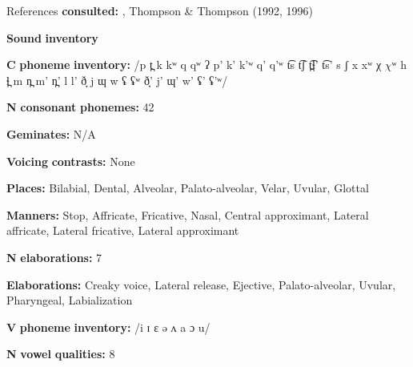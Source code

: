 \begin{styleBody}
References \textbf{consulted:} \citet{Koch2008}, Thompson \& Thompson (1992, 1996)
\end{styleBody}

\begin{styleBody}
\textbf{Sound} \textbf{inventory}
\end{styleBody}

\begin{styleBody}
\textbf{C} \textbf{phoneme} \textbf{inventory:} /p t̪ k kʷ q qʷ ʔ p’ k’ k’ʷ q’ q’ʷ t͡s t͡ʃ t̪͡ɬ’ t͡s’ s ʃ x xʷ χ $\chi ʷ$ h ɬ̪ m n̪ m’ n̪’ l l’ ð̞ j ɰ w ʢ ʢʷ ð̞’ j’ ɰ’ w’ ʢ’ ʢ’ʷ/
\end{styleBody}

\begin{styleBody}
\textbf{N} \textbf{consonant} \textbf{phonemes:} 42
\end{styleBody}

\begin{styleBody}
\textbf{Geminates:} N/A
\end{styleBody}

\begin{styleBody}
\textbf{Voicing} \textbf{contrasts:} None
\end{styleBody}

\begin{styleBody}
\textbf{Places:} Bilabial, Dental, Alveolar, Palato-alveolar, Velar, Uvular, Glottal 
\end{styleBody}

\begin{styleBody}
\textbf{Manners:} Stop, Affricate, Fricative, Nasal, Central approximant, Lateral affricate, Lateral fricative, Lateral approximant
\end{styleBody}

\begin{styleBody}
\textbf{N} \textbf{elaborations:} 7
\end{styleBody}

\begin{styleBody}
\textbf{Elaborations:} Creaky voice, Lateral release, Ejective, Palato-alveolar, Uvular, Pharyngeal, Labialization
\end{styleBody}

\begin{styleBody}
\textbf{V} \textbf{phoneme} \textbf{inventory:} /i ɪ ɛ ə ʌ a ɔ u/
\end{styleBody}

\begin{styleBody}
\textbf{N} \textbf{vowel} \textbf{qualities:} 8
\end{styleBody}

